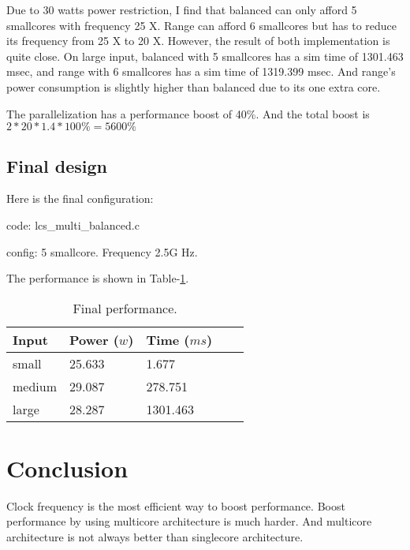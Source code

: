 \documentclass[twocolumn,letterpaper,10pt]{article}
\begin{document}
Due to 30 watts power restriction, I find that balanced can only
afford 5 smallcores with frequency 25 X. Range can afford 6 smallcores
but has to reduce its frequency from 25 X to 20 X. However, the result
of both implementation is quite close. On large input, balanced with 5
smallcores has a sim time of 1301.463 msec, and range with 6
smallcores has a sim time of 1319.399 msec. And range's power
consumption is slightly higher than balanced due to its one extra
core.

The parallelization has a performance boost of 40\%. And the total
boost is $2*20*1.4*100\%=5600\%$

\subsection{Final design}

Here is the final configuration:

code: lcs\_multi\_balanced.c

config: 5 smallcore. Frequency 2.5G Hz.

The performance is shown in Table-\ref{tab:foo}.

\begin{table}[ht!]
  \begin{center}
    \begin{tabular}{lllrr}
      \toprule
      Input    &  Power ($w$)  &  Time ($ms$)  \\
      \midrule
      small    &  25.633  &      1.677  \\
      medium   &  29.087  &    278.751  \\
      large    &  28.287  &   1301.463  \\
      \bottomrule
    \end{tabular}
  \end{center}
  \caption{Final performance.\label{tab:foo}}
\end{table}

\section{Conclusion}

Clock frequency is the most efficient way to boost performance. Boost
performance by using multicore architecture is much harder. And
multicore architecture is not always better than singlecore
architecture.

 
\end{document}
